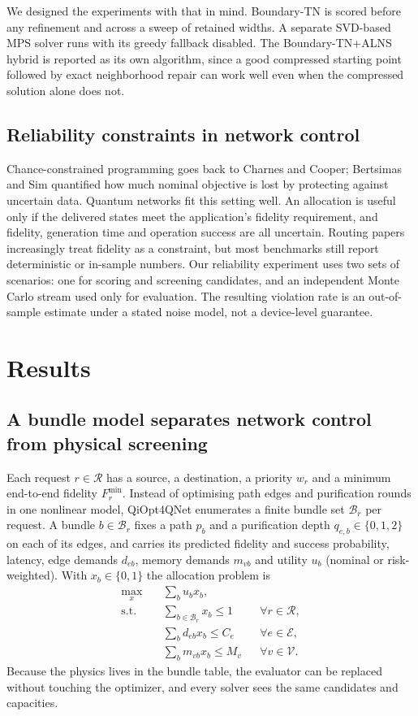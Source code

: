 \documentclass[pdflatex,sn-nature]{sn-jnl}
\newcommand{\Bset}{\mathcal{B}}
\newcommand{\Rset}{\mathcal{R}}
\newcommand{\Eset}{\mathcal{E}}
\newcommand{\Vset}{\mathcal{V}}
\theoremstyle{plain}
\theoremstyle{remark}
\begin{document}
We designed the experiments with that in mind. Boundary-TN is scored before any refinement and across a sweep of retained widths. A separate SVD-based MPS solver runs with its greedy fallback disabled. The Boundary-TN+ALNS hybrid is reported as its own algorithm, since a good compressed starting point followed by exact neighborhood repair can work well even when the compressed solution alone does not.

\subsection{Reliability constraints in network control}

Chance-constrained programming goes back to Charnes and Cooper\cite{charnes1959}; Bertsimas and Sim quantified how much nominal objective is lost by protecting against uncertain data\cite{bertsimas2004}. Quantum networks fit this setting well. An allocation is useful only if the delivered states meet the application's fidelity requirement, and fidelity, generation time and operation success are all uncertain. Routing papers increasingly treat fidelity as a constraint\cite{li2021,halder2024,halder2026}, but most benchmarks still report deterministic or in-sample numbers. Our reliability experiment uses two sets of scenarios: one for scoring and screening candidates, and an independent Monte Carlo stream used only for evaluation. The resulting violation rate is an out-of-sample estimate under a stated noise model, not a device-level guarantee.

\section{Results}\label{sec:results}

\subsection{A bundle model separates network control from physical screening}

Each request $r\in\Rset$ has a source, a destination, a priority $w_r$ and a minimum end-to-end fidelity $F_r^{\min}$. Instead of optimising path edges and purification rounds in one nonlinear model, QiOpt4QNet enumerates a finite bundle set $\Bset_r$ per request. A bundle $b\in\Bset_r$ fixes a path $p_b$ and a purification depth $q_{e,b}\in\{0,1,2\}$ on each of its edges, and carries its predicted fidelity and success probability, latency, edge demands $d_{eb}$, memory demands $m_{vb}$ and utility $u_b$ (nominal or risk-weighted). With $x_b\in\{0,1\}$ the allocation problem is
\begin{align}
\max_x\quad &\sum_b u_bx_b,\label{eq:allocobj}\\
\text{s.t.}\quad &\sum_{b\in\Bset_r}x_b\le 1 &&\forall r\in\Rset,\label{eq:req}\\
&\sum_b d_{eb}x_b\le C_e &&\forall e\in\Eset,\label{eq:edgecap}\\
&\sum_b m_{vb}x_b\le M_v &&\forall v\in\Vset.\label{eq:memcap}
\end{align}
Because the physics lives in the bundle table, the evaluator can be replaced without touching the optimizer, and every solver sees the same candidates and capacities.
\end{document}
